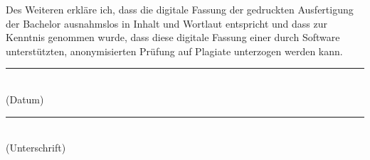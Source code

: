 \documentclass[
  fontsize=12pt,     %
  a4paper,
  twoside=false,     %
  numbers=noenddot,
  parskip=never,     %
  chapterprefix=false,
]{scrreprt}
\begin{document}
\vspace{1em}

Des Weiteren erkläre ich, dass die digitale Fassung der gedruckten Ausfertigung der Bachelor ausnahmslos in Inhalt und Wortlaut entspricht und dass zur Kenntnis genommen wurde, dass diese digitale Fassung einer durch Software unterstützten, anonymisierten Prüfung auf Plagiate unterzogen werden kann.

\vfill

\noindent
\begin{minipage}[t]{0.42\textwidth}
	\rule{\textwidth}{0.4pt}\\[-0.2em]
	(Datum)
\end{minipage}
\hfill
\begin{minipage}[t]{0.42\textwidth}
	\rule{\textwidth}{0.4pt}\\[-0.2em]
	(Unterschrift)
\end{minipage}
\end{document}
